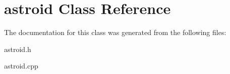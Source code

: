 \hypertarget{classastroid}{\section{astroid Class Reference}
\label{classastroid}
}


The documentation for this class was generated from the following files\-:\begin{DoxyCompactItemize}
\item 
astroid.\-h\item 
astroid.\-cpp\end{DoxyCompactItemize}
